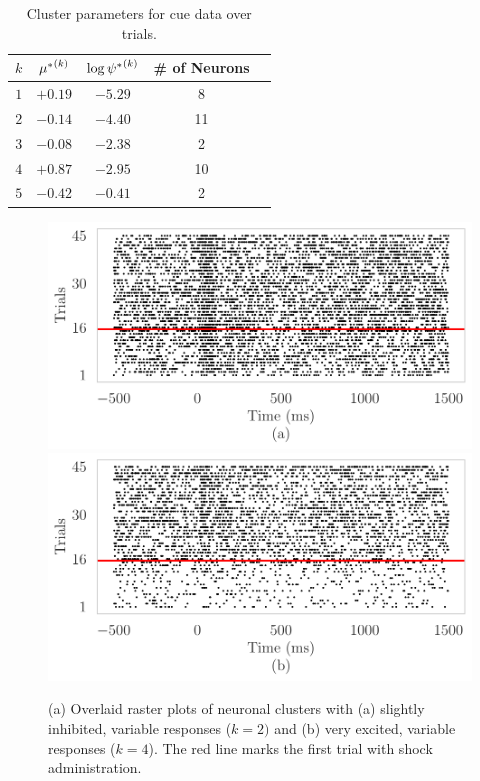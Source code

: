 \documentclass[twoside]{article}
\begin{document}
\begin{table}[h]
\vspace{-3mm}
\caption{Cluster parameters for cue data over trials.} \label{shock-table}
\begin{center}
\begin{tabular}{c|cccl}
$k$ & ${\mu^*}^{(k)}_{}$ & $\log {\psi^*}^{(k)}_{}$ &\# of Neurons \\
\hline
$1$ & $+0.19$ & $-5.29$ & 8  \\
$2$ &$-0.14$ & $-4.40$ & 11 \\
$3$ &$-0.08$ & $-2.38$  & 2 \\
$4$ &$+0.87$ & $-2.95$ & 10 \\
$5$ &$-0.42$ & $-0.41$ & 2 
\end{tabular}
\vspace{-4mm}
\end{center}
\end{table} 

\begin{figure}[h]
\begin{center}
\includegraphics[scale=0.45]{../img/shock-mod-cue-raster-a.pdf}
\includegraphics[scale=0.45]{../img/shock-mod-cue-raster-b.pdf}
\end{center}
\caption{(a) Overlaid raster plots of neuronal clusters with (a) slightly inhibited, variable responses ($k = 2)$ and (b) very excited, variable responses ($k = 4$). The red line marks the first trial with shock administration.} \label{shock-rasters}
\end{figure}
\end{document}
